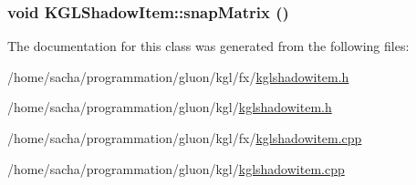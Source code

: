 \hypertarget{class_k_g_l_shadow_item_e597951a632787a9f9ada111a051db8a}{
\subsubsection[{snapMatrix}]{\setlength{\rightskip}{0pt plus 5cm}void KGLShadowItem::snapMatrix ()}}
\label{class_k_g_l_shadow_item_e597951a632787a9f9ada111a051db8a}




The documentation for this class was generated from the following files:\begin{CompactItemize}
\item 
/home/sacha/programmation/gluon/kgl/fx/\hyperlink{fx_2kglshadowitem_8h}{kglshadowitem.h}\item 
/home/sacha/programmation/gluon/kgl/\hyperlink{kglshadowitem_8h}{kglshadowitem.h}\item 
/home/sacha/programmation/gluon/kgl/fx/\hyperlink{fx_2kglshadowitem_8cpp}{kglshadowitem.cpp}\item 
/home/sacha/programmation/gluon/kgl/\hyperlink{kglshadowitem_8cpp}{kglshadowitem.cpp}\end{CompactItemize}
